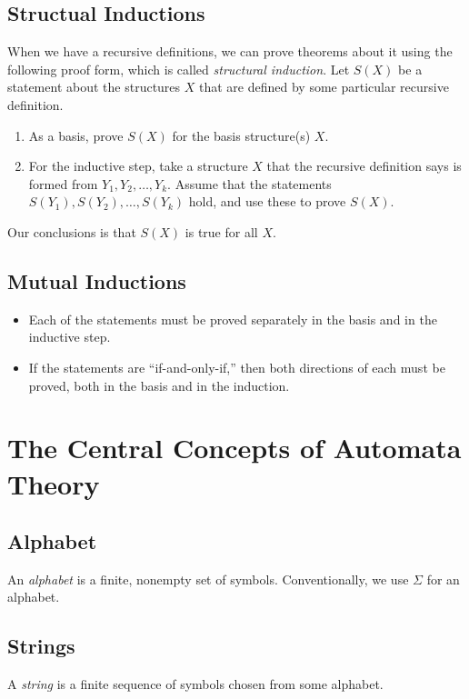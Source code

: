 \documentclass[]{article}
\begin{document}
  \subsection*{Structual Inductions}
    When we have a recursive definitions, we can prove theorems about it using
    the following proof form, which is called \emph{structural induction}. Let
    $S(X)$ be a statement about the structures $X$ that are defined by some
    particular recursive definition.
    \begin{enumerate}
      \item As a basis, prove $S(X)$ for the basis structure(s) $X$.
      \item For the inductive step, take a structure $X$ that the recursive
      definition says is formed from $Y_1, Y_2, \ldots, Y_k$. Assume that the
      statements \\ $S(Y_1), S(Y_2),\ldots, S(Y_k)$ hold, and use these to 
      prove $S(X)$.
    \end{enumerate}  
  Our conclusions is that $S(X)$ is true for all $X$.
  
  \subsection*{Mutual Inductions}
    \begin{itemize}
      \item Each of the statements must be proved separately in the basis and
      in the inductive step.
      \item If the statements are ``if-and-only-if,'' then both directions of
      each must be proved, both in the basis and in the induction.
    \end{itemize}
    
\section{The Central Concepts of Automata Theory}
  \subsection*{Alphabet}
    An \emph{alphabet} is a finite, nonempty set of symbols. Conventionally, we
    use $\Sigma$ for an alphabet.
  
  \subsection*{Strings}
    A \emph{string} is a finite sequence of symbols chosen from some alphabet.
  
\end{document}
